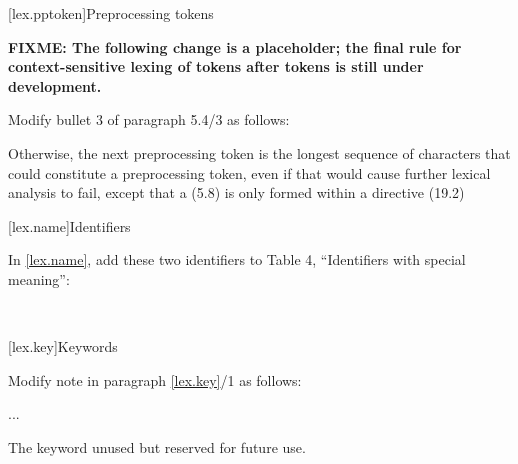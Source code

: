\begin{after}
\setcounter{section}{3}
[lex.pptoken]{Preprocessing tokens}

\textbf{\color{red}FIXME: The following change is a placeholder; the final rule for
context-sensitive lexing of  tokens
after  tokens is still under development.}

Modify bullet 3 of paragraph 5.4/3 as follows:

\begin{std.txt}
Otherwise, the next preprocessing token is
the longest sequence of characters
that could constitute a preprocessing token,
even if that would cause further lexical analysis to fail,
except that a  (5.8)
is only formed
within a  directive (19.2)
\end{std.txt}
\end{after}

\setcounter{section}{9}
[lex.name]{Identifiers}

In \ref{lex.name}, add these two identifiers to Table 4,
``Identifiers with special meaning'':

\begin{std.txt}
\\
\end{std.txt}

\setcounter{section}{10}
[lex.key]{Keywords}

\noindent
Modify note in paragraph \ref{lex.key}/1 as follows:
\begin{std.txt}
    \resetalinea[0]
    \alinea
    ...


    \enternote
    The   keyword 
    unused but   
    reserved for future use.
    \exitnote
\end{std.txt}
